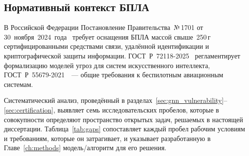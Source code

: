 \subsection{Нормативный контекст БПЛА}

В Российской Федерации Постановление Правительства~№\,1701 от
30~ноября~2024~года~\cite{decree_1701} требует оснащения БПЛА массой
свыше~250\,г сертифицированными средствами связи, удалённой
идентификации и криптографической защиты информации. \mbox{ГОСТ~Р~72118-2025}~\cite{GOST_R_72118_2025} регламентирует
формализацию моделей угроз для систем искусственного интеллекта,
\mbox{ГОСТ~Р~55679-2021}~\cite{GOST_R_55679_2021}~--- общие требования
к беспилотным авиационным системам.

\label{sec:gap_summary}%

Систематический анализ, проведённый в разделах~\ref{sec:gnn_vulnerability}--\ref{sec:certification}, выявляет семь исследовательских пробелов, которые в совокупности определяют пространство открытых задач, решаемых в настоящей диссертации. Таблица~\ref{tab:gaps} сопоставляет каждый пробел рабочим условиям и требованиям, которые он затрагивает, и указывает разработанную в Главе~\ref{ch:methods} модель/алгоритм для его решения.

